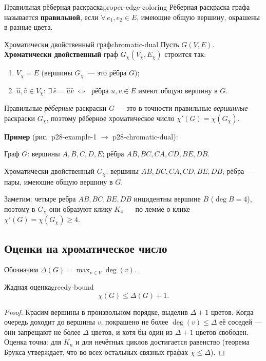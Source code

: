 \begin{defn}{Правильная рёберная раскраска}{proper-edge-coloring}
Рёберная раскраска графа называется \textbf{правильной}, если $\forall\, e_1, e_2 \in E$, имеющие общую вершину, окрашены в разные цвета.
\end{defn}

\begin{defn}{Хроматически двойственный граф}{chromatic-dual}
Пусть $G(V, E)$. \textbf{Хроматически двойственный} граф $G_\chi(V_\chi, E_\chi)$ строится так:
\begin{enumerate}
  \item $V_\chi = E$ \quad (вершины $G_\chi$~--- это рёбра $G$);
  \item $\hat{u}, \hat{v} \in V_\chi$: $\exists\, \hat{e} = \hat{u}\hat{v} \;\Leftrightarrow\;$ рёбра $u, v \in E$ имеют общую вершину в $G$.
\end{enumerate}
Правильные \emph{рёберные} раскраски $G$ --- это в точности правильные
\emph{вершинные} раскраски $G_\chi$, поэтому рёберное хроматическое
число $\chi'(G) = \chi(G_\chi)$.
\end{defn}

\textbf{Пример} (рис.~p28-example-1 $\to$ p28-chromatic-dual):

Граф $G$: вершины $A, B, C, D, E$; рёбра $AB, BC, CA, CD, BE, DB$.

Хроматически двойственный $G_\chi$: вершины $AB, BC, CA, CD, BE, DB$; рёбра~--- пары, имеющие общую вершину в $G$.


Заметим: четыре ребра $AB, BC, BE, DB$ инцидентны вершине $B$
($\deg B = 4$), поэтому в $G_\chi$ они образуют клику $K_4$ --- по
лемме о клике $\chi'(G) = \chi(G_\chi) \ge 4$.

\subsection*{Оценки на хроматическое число}

Обозначим $\Delta(G) = \max_{v \in V} \deg(v)$.

\begin{statement}{Жадная оценка}{greedy-bound}
\[
  \chi(G) \leq \Delta(G) + 1.
\]
\end{statement}

\begin{proof}
Красим вершины в произвольном порядке, выделив $\Delta + 1$ цветов.
Когда очередь доходит до вершины $v$, покрашено не более $\deg(v) \le
\Delta$ её соседей --- они запрещают не более $\Delta$ цветов, и хотя
бы один из $\Delta + 1$ цветов свободен. Оценка точна: для $K_n$ и для
нечётных циклов достигается равенство (теорема Брукса утверждает, что
во всех остальных связных графах $\chi \le \Delta$).
\end{proof}

